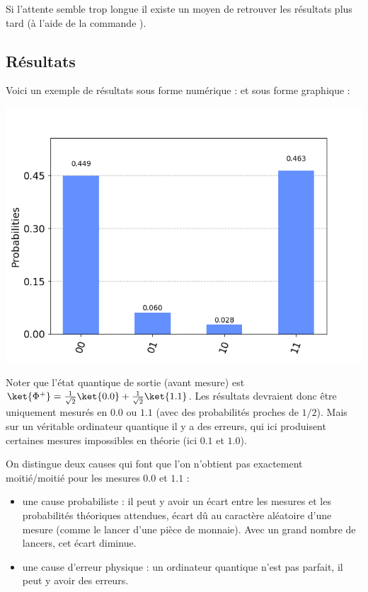 \documentclass[11pt,class=report,crop=false]{standalone}
\begin{document}
Si l'attente semble trop longue il existe un moyen de retrouver les résultats plus tard (à l'aide de la commande ).

\subsection{Résultats}

Voici un exemple de résultats sous forme numérique :
et sous forme graphique :
\begin{center}
\includegraphics[scale=\myscale,scale=0.5]{figures/fig-qiskit-real}
\end{center}

Noter que l'état quantique de sortie (avant mesure) est
$\ket{\Phi^+} =  \frac1{\sqrt2} \ket{0.0} + \frac1{\sqrt2} \ket{1.1}$.
Les résultats devraient donc être uniquement mesurés en $0.0$ ou $1.1$ (avec des probabilités proches de $1/2$). Mais sur un véritable ordinateur quantique il y a des erreurs, qui ici produisent certaines mesures impossibles en théorie (ici $0.1$ et $1.0$).

On distingue deux causes qui font que l'on n'obtient pas exactement moitié/moitié pour les mesures $0.0$ et $1.1$ :
\begin{itemize}
  \item une cause probabiliste : il peut y avoir un écart entre les mesures et les probabilités théoriques attendues, écart dû au caractère aléatoire d'une mesure (comme le lancer d'une pièce de monnaie). Avec un grand nombre de lancers, cet écart diminue.
  \item une cause d'erreur physique : un ordinateur quantique n'est pas parfait, il peut y avoir des erreurs.
\end{itemize} 
\end{document}

